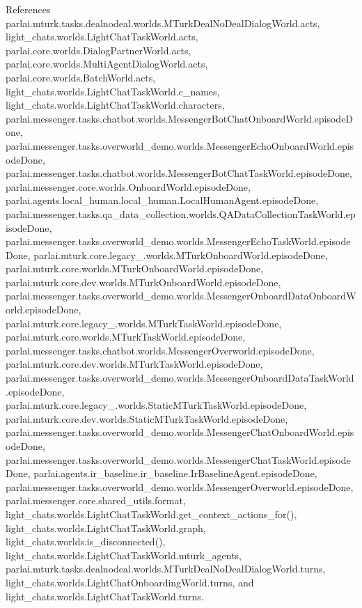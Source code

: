 References parlai.\+mturk.\+tasks.\+dealnodeal.\+worlds.\+M\+Turk\+Deal\+No\+Deal\+Dialog\+World.\+acts, light\+\_\+chats.\+worlds.\+Light\+Chat\+Task\+World.\+acts, parlai.\+core.\+worlds.\+Dialog\+Partner\+World.\+acts, parlai.\+core.\+worlds.\+Multi\+Agent\+Dialog\+World.\+acts, parlai.\+core.\+worlds.\+Batch\+World.\+acts, light\+\_\+chats.\+worlds.\+Light\+Chat\+Task\+World.\+c\+\_\+names, light\+\_\+chats.\+worlds.\+Light\+Chat\+Task\+World.\+characters, parlai.\+messenger.\+tasks.\+chatbot.\+worlds.\+Messenger\+Bot\+Chat\+Onboard\+World.\+episode\+Done, parlai.\+messenger.\+tasks.\+overworld\+\_\+demo.\+worlds.\+Messenger\+Echo\+Onboard\+World.\+episode\+Done, parlai.\+messenger.\+tasks.\+chatbot.\+worlds.\+Messenger\+Bot\+Chat\+Task\+World.\+episode\+Done, parlai.\+messenger.\+core.\+worlds.\+Onboard\+World.\+episode\+Done, parlai.\+agents.\+local\+\_\+human.\+local\+\_\+human.\+Local\+Human\+Agent.\+episode\+Done, parlai.\+messenger.\+tasks.\+qa\+\_\+data\+\_\+collection.\+worlds.\+Q\+A\+Data\+Collection\+Task\+World.\+episode\+Done, parlai.\+messenger.\+tasks.\+overworld\+\_\+demo.\+worlds.\+Messenger\+Echo\+Task\+World.\+episode\+Done, parlai.\+mturk.\+core.\+legacy\+\_.\+worlds.\+M\+Turk\+Onboard\+World.\+episode\+Done, parlai.\+mturk.\+core.\+worlds.\+M\+Turk\+Onboard\+World.\+episode\+Done, parlai.\+mturk.\+core.\+dev.\+worlds.\+M\+Turk\+Onboard\+World.\+episode\+Done, parlai.\+messenger.\+tasks.\+overworld\+\_\+demo.\+worlds.\+Messenger\+Onboard\+Data\+Onboard\+World.\+episode\+Done, parlai.\+mturk.\+core.\+legacy\+\_.\+worlds.\+M\+Turk\+Task\+World.\+episode\+Done, parlai.\+mturk.\+core.\+worlds.\+M\+Turk\+Task\+World.\+episode\+Done, parlai.\+messenger.\+tasks.\+chatbot.\+worlds.\+Messenger\+Overworld.\+episode\+Done, parlai.\+mturk.\+core.\+dev.\+worlds.\+M\+Turk\+Task\+World.\+episode\+Done, parlai.\+messenger.\+tasks.\+overworld\+\_\+demo.\+worlds.\+Messenger\+Onboard\+Data\+Task\+World.\+episode\+Done, parlai.\+mturk.\+core.\+legacy\+\_.\+worlds.\+Static\+M\+Turk\+Task\+World.\+episode\+Done, parlai.\+mturk.\+core.\+dev.\+worlds.\+Static\+M\+Turk\+Task\+World.\+episode\+Done, parlai.\+messenger.\+tasks.\+overworld\+\_\+demo.\+worlds.\+Messenger\+Chat\+Onboard\+World.\+episode\+Done, parlai.\+messenger.\+tasks.\+overworld\+\_\+demo.\+worlds.\+Messenger\+Chat\+Task\+World.\+episode\+Done, parlai.\+agents.\+ir\+\_\+baseline.\+ir\+\_\+baseline.\+Ir\+Baseline\+Agent.\+episode\+Done, parlai.\+messenger.\+tasks.\+overworld\+\_\+demo.\+worlds.\+Messenger\+Overworld.\+episode\+Done, parlai.\+messenger.\+core.\+shared\+\_\+utils.\+format, light\+\_\+chats.\+worlds.\+Light\+Chat\+Task\+World.\+get\+\_\+context\+\_\+actions\+\_\+for(), light\+\_\+chats.\+worlds.\+Light\+Chat\+Task\+World.\+graph, light\+\_\+chats.\+worlds.\+is\+\_\+disconnected(), light\+\_\+chats.\+worlds.\+Light\+Chat\+Task\+World.\+mturk\+\_\+agents, parlai.\+mturk.\+tasks.\+dealnodeal.\+worlds.\+M\+Turk\+Deal\+No\+Deal\+Dialog\+World.\+turns, light\+\_\+chats.\+worlds.\+Light\+Chat\+Onboarding\+World.\+turns, and light\+\_\+chats.\+worlds.\+Light\+Chat\+Task\+World.\+turns.

